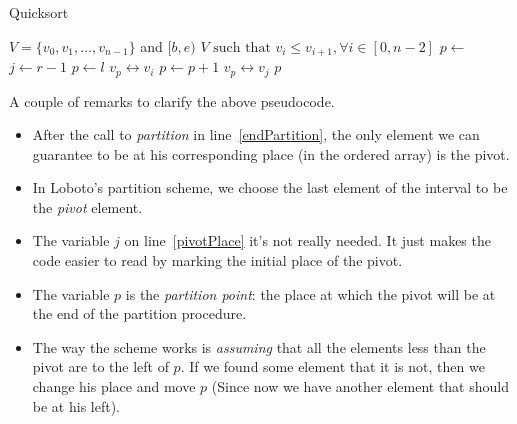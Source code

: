 \begin{algorithm}[H]
\caption{Quicksort}
\label{alg:quicksort}
\begin{algorithmic}[1] %
\Require $V = \{ v_0, v_1, \ldots, v_{n-1} \} $ and $[b,e)$ \Comment{An array $V$ of size $n$, and an inerval $[b,e)$ with $0 \leq b \leq e \leq n$}
\Ensure $V\text{ such that } v_i \leq v_{i + 1}, \forall i \in [0, n-2]$ 
 
     
        \State $p \gets$  \label{endPartition} 
        \State {} 
        \State {} 
    \EndIf
\EndProcedure
{} 
\State $j \gets r - 1$ \label{pivotPlace} 
\State $p \gets l$ 
 
     
        \State $v_p \leftrightarrow v_i$ 
        \State $p \gets p + 1$ 
    \EndIf
\EndFor
\State $v_p \leftrightarrow v_j$ 
\State \Return $p$ 
\EndProcedure
\end{algorithmic}
\end{algorithm}

A couple of remarks to clarify the above pseudocode.
\begin{itemize}
 \item After the call to \emph{partition} in line~\ref{endPartition}, the only element we can guarantee to be at his corresponding place (in the ordered array) is the pivot.
 \item In Loboto's partition scheme, we choose the last element of the interval to be the \emph{pivot} element.
 \item The variable $j$ on line~\ref{pivotPlace} it's not really needed. It just makes the code easier to read by marking the initial place of the pivot.
 \item The variable $p$ is the \emph{partition point}: the place at which the pivot will be at the end of the partition procedure.
 \item The way the scheme works is \emph{assuming} that all the elements less than the pivot are to the left of $p$. If we found some element that it is not, then we change his place and move $p$ (Since now we have another element that should be at his left).
\end{itemize}

